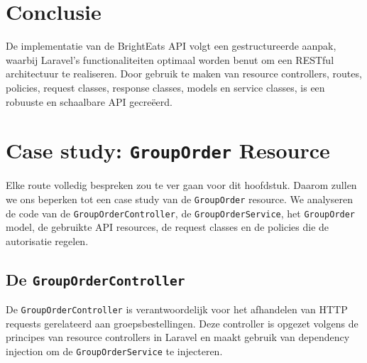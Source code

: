 \section{Conclusie}

De implementatie van de BrightEats API volgt een gestructureerde aanpak, waarbij Laravel's functionaliteiten optimaal worden benut om een RESTful architectuur te realiseren. Door gebruik te maken van resource controllers, routes, policies, request classes, response classes, models en service classes, is een robuuste en schaalbare API gecreëerd.

\section{Case study: \texttt{GroupOrder} Resource}

Elke route volledig bespreken zou te ver gaan voor dit hoofdstuk. Daarom zullen we ons beperken tot een case study van de \texttt{GroupOrder} resource. We analyseren de code van de \texttt{GroupOrderController}, de \texttt{GroupOrderService}, het \texttt{GroupOrder} model, de gebruikte API resources, de request classes en de policies die de autorisatie regelen.

\subsection{De \texttt{GroupOrderController}}

De \texttt{GroupOrderController} is verantwoordelijk voor het afhandelen van HTTP requests gerelateerd aan groepsbestellingen. Deze controller is opgezet volgens de principes van resource controllers in Laravel en maakt gebruik van dependency injection om de \texttt{GroupOrderService} te injecteren.

